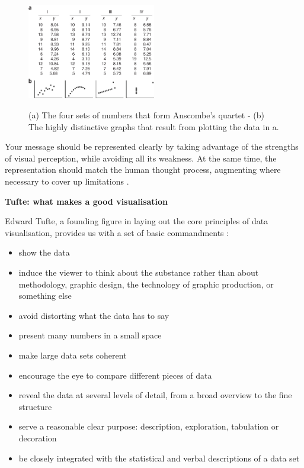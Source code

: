 \documentclass[a4paper,11pt,titlepage]{article}
\begin{document}
		\begin{figure}[H]
    			\centering	
				{{\includegraphics[width=0.5\textwidth]
    				{img/anscombes_quartet} 
    			}}%
    			\caption{(a) The four sets of numbers that form Anscombe's quartet -  (b) The highly distinctive graphs that result from plotting the data in a.}%
		\end{figure}
		
		\par 
		Your message should be represented clearly by taking advantage of the strengths of visual perception, while avoiding all its weakness. At the same time, the representation should match the human thought process, augmenting where necessary to cover up limitations \cite{Tufte2012}.
		\par 
		
\textbf{Tufte: what makes a good visualisation}
		
		Edward Tufte, a founding figure in laying out the core principles of data visualisation, provides us with a set of basic commandments \cite{Tufte2001}:
		
		\begin{itemize}
			\item show the data
			\item induce the viewer to think about the substance rather than about methodology, graphic design, the technology of graphic production, or something else
			\item avoid distorting what the data has to say
			\item present many numbers in a small space
			\item make large data sets coherent
			\item encourage the eye to compare different pieces of data
			\item reveal the data at several levels of detail, from a broad overview to the fine structure
			\item serve a reasonable clear purpose: description, exploration, tabulation or decoration
			\item be closely integrated with the statistical and verbal descriptions of a data set
		\end{itemize}
\end{document}
